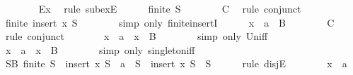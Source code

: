 \begin{isabellebody}
\ \ \ \ \ \ \isamarkupfalse%
\ Ex{}\ \isamarkupfalse%
\ {\isacharparenleft}rule\ subexE{\isacharparenright}\isanewline
\ \ \ \ \isamarkupfalse%
\ {\isachardoublequoteopen}finite\ S{\isacharprime}{\isachardoublequoteclose}\isanewline
\ \ \ \ \ \ \isamarkupfalse%
\ C{}\ \isamarkupfalse%
\ {\isacharparenleft}rule\ conjunct{}{\isacharparenright}\isanewline
\ \ \ \ \isamarkupfalse%
\ \isamarkupfalse%
\ {\isachardoublequoteopen}finite\ {\isacharparenleft}insert\ x\ S{\isacharprime}{\isacharparenright}{\isachardoublequoteclose}\isanewline
\ \ \ \ \ \ \isamarkupfalse%
\ {\isacharparenleft}simp\ only{\isacharcolon}\ finite{\isachardot}insertI{\isacharparenright}\isanewline
\ \ \ \ \isamarkupfalse%
\ {\isachardoublequoteopen}x\ {\isasymin}\ {\isacharbraceleft}a{\isacharbraceright}\ {\isasymunion}\ B{\isachardoublequoteclose}\isanewline
\ \ \ \ \ \ \isamarkupfalse%
\ C\ \isamarkupfalse%
\ {\isacharparenleft}rule\ conjunct{}{\isacharparenright}\isanewline
\ \ \ \ \isamarkupfalse%
\ \isamarkupfalse%
\ {\isachardoublequoteopen}x\ {\isasymin}\ {\isacharbraceleft}a{\isacharbraceright}\ {\isasymor}\ x\ {\isasymin}\ B{\isachardoublequoteclose}\isanewline
\ \ \ \ \ \ \isamarkupfalse%
\ {\isacharparenleft}simp\ only{\isacharcolon}\ Un{\isacharunderscore}iff{\isacharparenright}\isanewline
\ \ \ \ \isamarkupfalse%
\ \isamarkupfalse%
\ {\isachardoublequoteopen}x\ {\isacharequal}\ a\ {\isasymor}\ x\ {\isasymin}\ B{\isachardoublequoteclose}\isanewline
\ \ \ \ \ \ \isamarkupfalse%
\ {\isacharparenleft}simp\ only{\isacharcolon}\ singleton{\isacharunderscore}iff{\isacharparenright}\isanewline
\ \ \ \ \isamarkupfalse%
\ {\isachardoublequoteopen}{\isasymexists}S{\isacharprime}{\isacharprime}{\isasymsubseteq}B{\isachardot}\ finite\ S{\isacharprime}{\isacharprime}\ {\isasymand}\ {\isacharparenleft}insert\ x\ S\ {\isacharequal}\ {\isacharbraceleft}a{\isacharbraceright}\ {\isasymunion}\ S{\isacharprime}{\isacharprime}\ {\isasymor}\ insert\ x\ S\ {\isacharequal}\ S{\isacharprime}{\isacharprime}{\isacharparenright}{\isachardoublequoteclose}\isanewline
\ \ \ \ \isamarkupfalse%
\ {\isacharparenleft}rule\ disjE{\isacharparenright}\isanewline
\ \ \ \ \ \ \isamarkupfalse%
\ {\isachardoublequoteopen}x\ {\isacharequal}\ a{\isachardoublequoteclose}\isanewline

\end{isabellebody}
